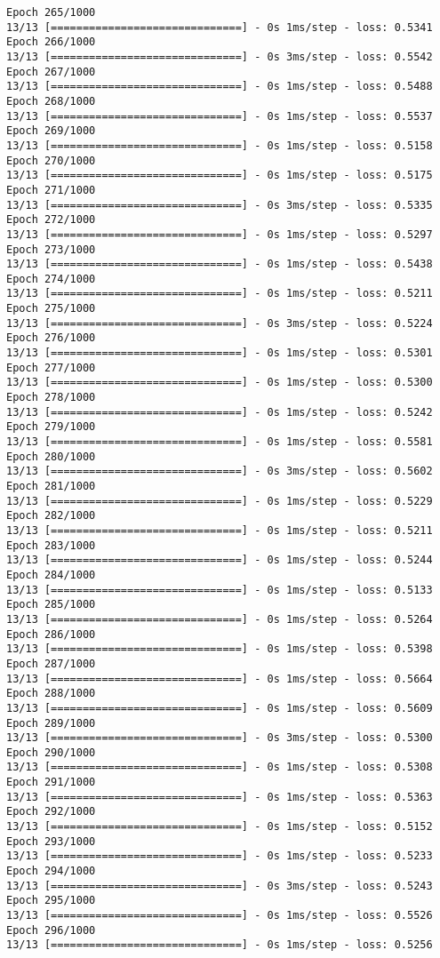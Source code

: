 \documentclass[11pt]{article}
\begin{document}
\begin{Verbatim}[commandchars=\\\{\}]
Epoch 265/1000
13/13 [==============================] - 0s 1ms/step - loss: 0.5341
Epoch 266/1000
13/13 [==============================] - 0s 3ms/step - loss: 0.5542
Epoch 267/1000
13/13 [==============================] - 0s 1ms/step - loss: 0.5488
Epoch 268/1000
13/13 [==============================] - 0s 1ms/step - loss: 0.5537
Epoch 269/1000
13/13 [==============================] - 0s 1ms/step - loss: 0.5158
Epoch 270/1000
13/13 [==============================] - 0s 1ms/step - loss: 0.5175
Epoch 271/1000
13/13 [==============================] - 0s 3ms/step - loss: 0.5335
Epoch 272/1000
13/13 [==============================] - 0s 1ms/step - loss: 0.5297
Epoch 273/1000
13/13 [==============================] - 0s 1ms/step - loss: 0.5438
Epoch 274/1000
13/13 [==============================] - 0s 1ms/step - loss: 0.5211
Epoch 275/1000
13/13 [==============================] - 0s 3ms/step - loss: 0.5224
Epoch 276/1000
13/13 [==============================] - 0s 1ms/step - loss: 0.5301
Epoch 277/1000
13/13 [==============================] - 0s 1ms/step - loss: 0.5300
Epoch 278/1000
13/13 [==============================] - 0s 1ms/step - loss: 0.5242
Epoch 279/1000
13/13 [==============================] - 0s 1ms/step - loss: 0.5581
Epoch 280/1000
13/13 [==============================] - 0s 3ms/step - loss: 0.5602
Epoch 281/1000
13/13 [==============================] - 0s 1ms/step - loss: 0.5229
Epoch 282/1000
13/13 [==============================] - 0s 1ms/step - loss: 0.5211
Epoch 283/1000
13/13 [==============================] - 0s 1ms/step - loss: 0.5244
Epoch 284/1000
13/13 [==============================] - 0s 1ms/step - loss: 0.5133
Epoch 285/1000
13/13 [==============================] - 0s 1ms/step - loss: 0.5264
Epoch 286/1000
13/13 [==============================] - 0s 1ms/step - loss: 0.5398
Epoch 287/1000
13/13 [==============================] - 0s 1ms/step - loss: 0.5664
Epoch 288/1000
13/13 [==============================] - 0s 1ms/step - loss: 0.5609
Epoch 289/1000
13/13 [==============================] - 0s 3ms/step - loss: 0.5300
Epoch 290/1000
13/13 [==============================] - 0s 1ms/step - loss: 0.5308
Epoch 291/1000
13/13 [==============================] - 0s 1ms/step - loss: 0.5363
Epoch 292/1000
13/13 [==============================] - 0s 1ms/step - loss: 0.5152
Epoch 293/1000
13/13 [==============================] - 0s 1ms/step - loss: 0.5233
Epoch 294/1000
13/13 [==============================] - 0s 3ms/step - loss: 0.5243
Epoch 295/1000
13/13 [==============================] - 0s 1ms/step - loss: 0.5526
Epoch 296/1000
13/13 [==============================] - 0s 1ms/step - loss: 0.5256

\end{Verbatim}
\end{document}
